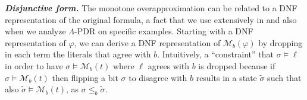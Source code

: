 \documentclass[acmsmall,screen]{acmart}
\newcommand{\para}[1]{\vspace{2pt}\noindent\textbf{\textit{#1.}}}
\newcommand{\monox}[2]{\mathcal{M}_{#2}({#1})}
\begin{document}
\para{Disjunctive form}
The monotone overapproximation can be related to a DNF representation of the original formula, a fact that we use extensively in  and also when we analyze $\Lambda$-PDR on specific examples.
Starting with a DNF representation of $\varphi$, we can derive a DNF representation of $\monox{\varphi}{b}$
%
by dropping in each term the literals that agree with $b$.
Intuitively, a ``constraint'' that $\sigma \models \ell$ in order to have $\sigma \models \monox{t}{b}$ where $\ell$ agrees with $b$ is dropped because if $\sigma \models \monox{t}{b}$ then flipping a bit $\sigma$ to disagree with $b$ results in a state $\tilde{\sigma}$
such that also
%
%
$\tilde{\sigma} \models \monox{t}{b}$, as $\sigma \leq_{b} \tilde{\sigma}$.
%
%

%
%
%
%
%
%
%
%
%

%

%
%
%
\end{document}

